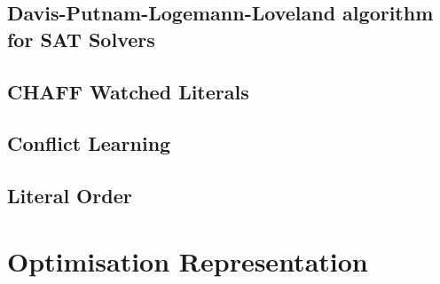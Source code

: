 


\subsection{Davis-Putnam-Logemann-Loveland algorithm for SAT Solvers}


\subsection{CHAFF Watched Literals}

\subsection{Conflict Learning}



\subsection{Literal Order}



\section{Optimisation Representation}

